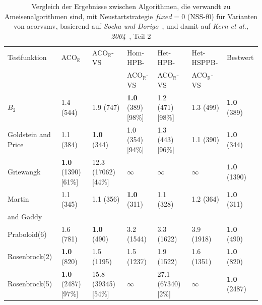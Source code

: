 \documentclass[fontsize=12, a4aper]{scrartcl}
\begin{document}
	\begin{table}[H]
		
		\caption{Vergleich der Ergebnisse zwischen Algorithmen, die verwandt zu Ameisenalgorithmen sind, mit Neustartstrategie \(fixed = 0\) (NSS-f0) für Varianten von \acl{acorvsmv}, basierend auf \textit{Socha und Dorigo}~\cite{socha2008ant}, und damit auf \textit{Kern et al., 2004}~\cite{kern2004learning}, Teil 2}
		
		\label{subsec:Vergleich_Von_ACO_R_Und_Iterationen_Von_ACO_R_Very_Simple:tab:Vergleich_Zu_Ameisen_Verwandte_Algorithmen_Teil_2}
		
		\scriptsize
		
		\begin{tabularx}{\linewidth}{X X X X X X X}
			
			\toprule
			
			Testfunktion & ACO\(_{\mathbb{R}}\) & ACO\(_{\mathbb{R}}\)-VS & Hom-HPB- & Het-HPB- & Het-HSPPB- & Bestwert\\
			&						&						  & ACO\(_\mathbb{R}\)-VS & ACO\(_\mathbb{R}\)-VS & ACO\(_\mathbb{R}\)-VS & \\
			
			\midrule
			
			\(B_2\) & 1.4 (544) & 1.9 (747) & \textbf{1.0} (389) [98\%] & 1.2 (471) [98\%] & 1.3 (499) & \textbf{1.0} (389)\\
			
			Goldstein and Price & 1.1 (384) & \textbf{1.0} (344) & 1.0 (354) [94\%] & 1.3 (443) [96\%] & 1.1 (390) & \textbf{1.0} (344)\\
			
			Griewangk & \textbf{1.0} (1390) [61\%] & 12.3 (17062) [44\%] & \(\infty\) & \(\infty\) & \(\infty\) & \textbf{1.0} (1390)\\
			
			Martin & 1.1 (345) & 1.1 (356) & \textbf{1.0} (311) & 1.1 (328) & 1.2 (364) & \textbf{1.0} (311)\\
			and Gaddy & & & & & & \\
			
			Praboloid(6) & 1.6 (781) & \textbf{1.0} (490) & 3.2 (1544) & 3.3 (1622) & 3.9 (1918) & \textbf{1.0} (490)\\
			
			Rosenbrock(2) & \textbf{1.0} (820) & 1.5 (1195) & 1.5 (1237) & 1.9 (1522) & 1.6 (1351) & \textbf{1.0} (820)\\
			
			Rosenbrock(5) & \textbf{1.0} (2487) [97\%] & 15.8 (39345) [54\%] & \(\infty\) & 27.1 (67340) [2\%] & \(\infty\) & \textbf{1.0} (2487)\\
			

\end{tabularx}
\end{table}
\end{document}
